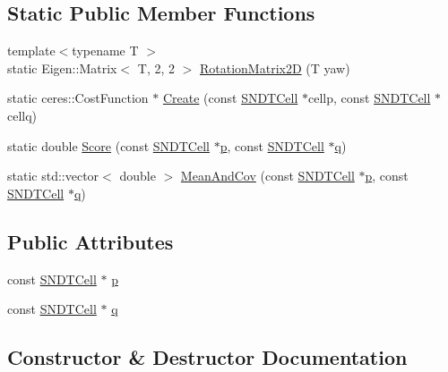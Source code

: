 \subsection*{Static Public Member Functions}
\begin{DoxyCompactItemize}
\item 
{\footnotesize template$<$typename T $>$ }\\static Eigen\+::\+Matrix$<$ T, 2, 2 $>$ \hyperlink{structSNDTCostFunctor_ac3ec5d55425287082f5ce7f1788715c7}{Rotation\+Matrix2D} (T yaw)
\item 
static ceres\+::\+Cost\+Function $\ast$ \hyperlink{structSNDTCostFunctor_a22ee42d8807a659af32c15d144ed0c6b}{Create} (const \hyperlink{classSNDTCell}{S\+N\+D\+T\+Cell} $\ast$cellp, const \hyperlink{classSNDTCell}{S\+N\+D\+T\+Cell} $\ast$cellq)
\item 
static double \hyperlink{structSNDTCostFunctor_a24876e79d893ae4a8fc098f85c615c6b}{Score} (const \hyperlink{classSNDTCell}{S\+N\+D\+T\+Cell} $\ast$\hyperlink{structSNDTCostFunctor_ac9abfd289124b6b30105e89266c062a0}{p}, const \hyperlink{classSNDTCell}{S\+N\+D\+T\+Cell} $\ast$\hyperlink{structSNDTCostFunctor_a2e02683aa3af214e6d8bb7ca40b9f0b3}{q})
\item 
static std\+::vector$<$ double $>$ \hyperlink{structSNDTCostFunctor_aec08f243fe9582c59c73a0a93a2c0f81}{Mean\+And\+Cov} (const \hyperlink{classSNDTCell}{S\+N\+D\+T\+Cell} $\ast$\hyperlink{structSNDTCostFunctor_ac9abfd289124b6b30105e89266c062a0}{p}, const \hyperlink{classSNDTCell}{S\+N\+D\+T\+Cell} $\ast$\hyperlink{structSNDTCostFunctor_a2e02683aa3af214e6d8bb7ca40b9f0b3}{q})
\end{DoxyCompactItemize}
\subsection*{Public Attributes}
\begin{DoxyCompactItemize}
\item 
const \hyperlink{classSNDTCell}{S\+N\+D\+T\+Cell} $\ast$ \hyperlink{structSNDTCostFunctor_ac9abfd289124b6b30105e89266c062a0}{p}
\item 
const \hyperlink{classSNDTCell}{S\+N\+D\+T\+Cell} $\ast$ \hyperlink{structSNDTCostFunctor_a2e02683aa3af214e6d8bb7ca40b9f0b3}{q}
\end{DoxyCompactItemize}


\subsection{Constructor \& Destructor Documentation}
\mbox{\label{structSNDTCostFunctor_aad83537dc2e4a90d2a5c74f59c5d50e0}} 
